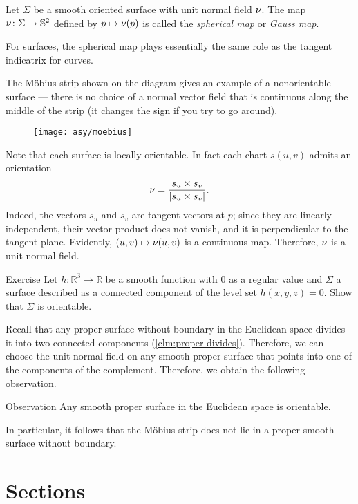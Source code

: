 Let $\Sigma$ be a smooth oriented surface with unit normal field $\nu$.
The map $\nu\colon\Sigma\to \mathbb{S}^2$ defined by $p\mapsto \nu(p)$ is called the \emph{spherical map} or \emph{Gauss map}.

For surfaces, the spherical map plays essentially the same role as the tangent indicatrix for curves.

The Möbius strip shown on the diagram gives an example of a nonorientable surface --- there is no choice of a normal vector field that is continuous along the middle of the strip (it changes the sign if you try to go around).

\begin{wrapfigure}{o}{42 mm}
\vskip-0mm
\centering
\texttt{[image: asy/moebius]}
\vskip0mm
\end{wrapfigure}

Note that each surface is locally orientable.
In fact each chart $s(u,v)$ admits an orientation 
\[\nu=
\frac{s_u\times s_v}
{\left|s_u\times s_v\right|}.\]
Indeed, the vectors $s_u$ and $s_v$ are tangent vectors at $p$; 
since they are linearly independent, their vector product does not vanish, and it is perpendicular to the tangent plane.
Evidently, $(u,v)\mapsto \nu(u,v)$ is a continuous map.
Therefore, $\nu$ is a unit normal field. 

\begin{thm}{Exercise}\label{ex:implicit-orientable}
Let $h:\mathbb{R}^3\to\mathbb{R}$ be a smooth function with $0$ as a regular value and $\Sigma$ a surface described as a connected component of the level set $h(x,y,z)=0$.
Show that $\Sigma$ is orientable.
\end{thm}

Recall that any proper surface without boundary in the Euclidean space divides it into two connected components (\ref{clm:proper-divides}).
Therefore, we can choose the unit normal field on any smooth proper surface that points into one of the components of the complement.
Therefore, we obtain the following observation. 

\begin{thm}{Observation}
Any smooth proper surface in the Euclidean space is orientable.
\end{thm}

In particular, it follows that the Möbius strip does not lie in a proper smooth surface without boundary.

\section{Sections}

